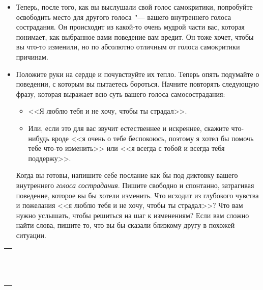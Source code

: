 \begin{itemize}
	\item Теперь, после того, как вы выслушали свой голос самокритики, попробуйте освободить место для другого голоса~"--- вашего внутреннего голоса сострадания. Он происходит из какой-то очень мудрой части вас, которая понимает, как выбранное вами поведение вам вредит. Он тоже хочет, чтобы вы что-то изменили, но по абсолютно отличным от голоса самокритики причинам.
	
	\item Положите руки на сердце и почувствуйте их тепло. Теперь опять подумайте о поведении, с которым вы пытаетесь бороться. Начните повторять следующую фразу, которая выражает всю суть вашего голоса самосострадания:
	\begin{itemize}
		\item <<Я люблю тебя и не хочу, чтобы ты страдал>>. 
		
		\item Или, если это для вас звучит естественнее и искреннее, скажите что-нибудь вроде <<я очень о тебе беспокоюсь, поэтому я хотел бы помочь тебе что-то изменить>> или <<я всегда с тобой и всегда тебя поддержу>>.	
	\end{itemize}

	\itemWritingHand Когда вы готовы, напишите себе послание как бы под диктовку вашего внутреннего \emph{голоса сострадания}. Пишите свободно и спонтанно, затрагивая поведение, которое вы бы хотели изменить. Что исходит из глубокого чувства и пожелания <<я люблю тебя и не хочу, чтобы ты страдал>>? Что вам нужно услышать, чтобы решиться на шаг к изменениям? Если вам сложно найти слова, пишите то, что вы бы сказали близкому другу в похожей ситуации.
\end{itemize}

\setlength{\extrarowheight}{2mm}
\begin{tabularx}{0.96\textwidth}{X}
	\\
	\arrayrulecolor{gray}\hline\\
	\hline\\
	\hline\\
	\hline\\
	\hline\\
	\hline\\	
	\hline\\
	\hline\\
	\hline\\
	\hline\\
	\hline\\
	\hline\\
	\hline\\
\end{tabularx}
\setlength{\extrarowheight}{0mm}

